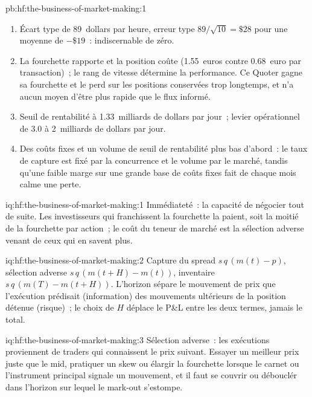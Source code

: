 \begin{solution}{pb:hf:the-business-of-market-making:1}
\begin{enumerate}
\item Écart type de 89~dollars par heure, erreur type $89/\sqrt{10}=\$28$ pour une moyenne de $-\$19$~: indiscernable de zéro.
\item La fourchette rapporte et la position coûte (1.55~euros contre 0.68~euro par transaction)~; le rang de vitesse détermine la performance. Ce Quoter gagne sa fourchette et
le perd sur les positions conservées trop longtemps, et n'a aucun moyen d'être plus rapide que le flux informé.
\item Seuil de rentabilité à 1.33~milliards de dollars par jour~; levier opérationnel de 3.0 à 2~milliards de dollars par jour.
\item Des coûts fixes et un volume de seuil de rentabilité plus bas d'abord~: le taux de capture est fixé par la concurrence et le volume par le marché, tandis qu'une faible marge sur une
grande base de coûts fixes fait de chaque mois calme une perte.
\end{enumerate}
\end{solution}

\begin{solution}{iq:hf:the-business-of-market-making:1}
Immédiateté~: la capacité de négocier tout de suite. Les investisseurs qui franchissent la fourchette la paient, soit la moitié de la fourchette par action~; le coût du teneur de marché est la
sélection adverse venant de ceux qui en savent plus.
\end{solution}

\begin{solution}{iq:hf:the-business-of-market-making:2}
Capture du spread $s\,q\,(m(t)-p)$, sélection adverse $s\,q\,(m(t+H)-m(t))$, inventaire $s\,q\,(m(T)-m(t+H))$. L'horizon sépare le mouvement de prix
que l'exécution prédisait (information) des mouvements ultérieurs de la position détenue (risque)~; le choix de $H$ déplace le P\&L entre les deux termes, jamais le
total.
\end{solution}

\begin{solution}{iq:hf:the-business-of-market-making:3}
Sélection adverse~: les exécutions proviennent de traders qui connaissent le prix suivant. Essayer un meilleur prix juste que le mid, pratiquer un skew ou élargir la fourchette lorsque le carnet ou
l'instrument principal signale un mouvement, et il faut se couvrir ou débouclér dans l'horizon sur lequel le mark-out s'estompe.
\end{solution}

